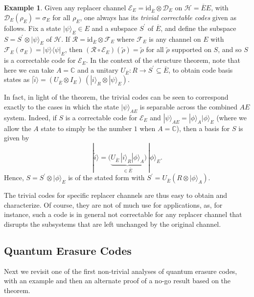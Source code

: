 \documentclass[11pt]{amsart}
\theoremstyle{definition}
\newtheorem{example}[thm]{Example}
\theoremstyle{definition}
\theoremstyle{definition}
\newcommand{\1}{\mathbb{I}}
\def\ket#1{| #1 \rangle}
\def\kb#1#2{|#1\rangle\!\langle #2 |}
\begin{document}
\begin{example}
Given any replacer channel $\mathcal E_E = \mathrm{id}_{\overline{E}} \otimes \mathcal D_E$ on $\mathcal H = \overline{E} E$, with $\mathcal D_E(\rho_E) = \sigma_E$ for all $\rho_E$, one always has its {\it trivial correctable codes} given as follows. Fix a state $\ket{\psi}_E \in E$ and a subspace $S^\prime$ of $\overline{E}$, and define the subspace $S = S^\prime \otimes \ket{\psi}_E$ of $\mathcal H$. If $\mathcal R = \mathrm{id}_{\overline{E}} \otimes \mathcal F_E$ where $\mathcal F_E$ is any channel on $E$ with $\mathcal F_E(\sigma_E) = \kb{\psi}{\psi}_E$, then $(\mathcal R \circ \mathcal E_E)(\widetilde{\rho}) = \widetilde{\rho}$ for all $\widetilde{\rho}$ supported on $S$, and so $S$ is a correctable code for $\mathcal E_E$. In the context of the structure theorem, note that here we can take $A=\mathbb C$ and a unitary $U_{\overline{E}}: R \rightarrow S^\prime \subseteq \overline{E}$, to obtain code basis states as $\ket{\widetilde{i}} = ( U_{\overline{E}} \otimes I_E ) \, ( \ket{i}_R \otimes \ket{\psi}_{E})$.

In fact, in light of the theorem, the trivial codes can be seen to correspond exactly to the cases in which the state $\ket{\psi}_{AE}$ is separable across the combined $AE$ system. Indeed, if $S$ is a correctable code for $\mathcal E_E$ and $\ket{\psi}_{AE} = \ket{\phi}_A \ket{\phi}_E$ (where we allow the $A$ state to simply be the number $1$ when $A=\mathbb C$), then a basis for $S$ is given by 
\[
\ket{\widetilde{i}} = \big( \underbrace{U_{\overline{E}} \,  \ket{i}_R \ket{\phi}_A}_{\in \overline{E}} \big) \, \ket{\phi}_{E}.
\]
Hence, $S = S^\prime \otimes \ket{\phi}_E$ is of the stated form with $S^\prime = U_{\overline{E}} (R \otimes \ket{\phi}_A)$. 
\end{example}

The trivial codes for specific replacer channels are thus easy to obtain and characterize. Of course, they are not of much use for applications, as, for instance, such a code is in general not correctable for any replacer channel that disrupts the subsystems that are left unchanged by the original channel. 


\subsection{Quantum Erasure Codes}

Next we revisit one of the first non-trivial analyses of quantum erasure codes, with an example and then an alternate proof of a no-go result based on the theorem. 
\end{document}
